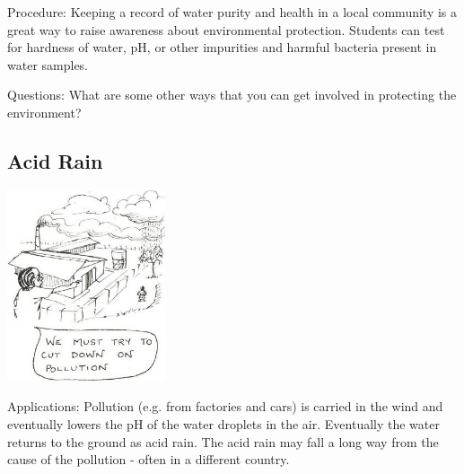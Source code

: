 \begin{multicols}{2}
\begin{description*}
\item[Procedure:]{Keeping a record of water purity and health in a local community is a great way to raise awareness about environmental protection. Students can test for hardness of water, pH, or other impurities and harmful bacteria present in water samples.}
\item[Questions:]{What are some other ways that you can get involved in protecting the environment?}
\end{description*}

\subsection{Acid Rain}

\begin{center}
\includegraphics[width=0.35\textwidth]{./img/source/acid-rain.jpg}
\end{center}

\begin{description*}
\item[Applications:]{Pollution (e.g. from factories and cars) is carried in the wind and eventually lowers the pH of the water droplets in the air. Eventually the water returns to the ground as acid rain. The acid rain may fall a long way from the cause of the pollution - often in a different country.}
\end{description*}


\end{multicols}
